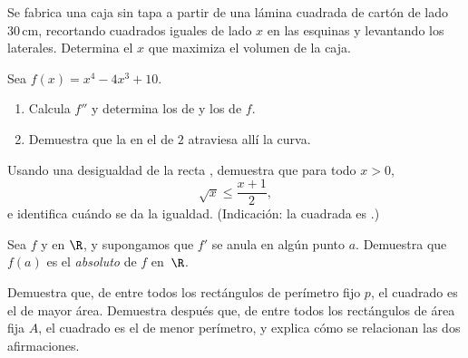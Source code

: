 \begin{exercise}[$\star\star$]\label{exo:g12:deriv:5}
Se fabrica una caja sin tapa a partir de una lámina cuadrada de cartón de
lado $30\,$cm, recortando cuadrados iguales de lado $x$ en las esquinas y
levantando los laterales. Determina el $x$ que maximiza el volumen de la
caja.
\end{exercise}

\begin{exercise}[$\star\star$]\label{exo:g12:deriv:6}
Sea $f(x) = x^4 - 4x^3 + 10$.
\begin{enumerate}
  \item Calcula $f''$ y determina los  de  y los  de $f$.
  \item Demuestra que la  en el  de  $2$
        atraviesa allí la curva.
\end{enumerate}
\end{exercise}

\begin{exercise}[$\star\star$]\label{exo:g12:deriv:7}
Usando una desigualdad de la recta , demuestra que para todo
$x > 0$,
\[
\sqrt{x} \leq \frac{x + 1}{2},
\]
e identifica cuándo se da la igualdad. (Indicación: la  cuadrada es
.)
\end{exercise}

\begin{exercise}[$\star\star\star$]\label{exo:g12:deriv:8}
Sea $f$  y  en $\R$, y supongamos que $f'$ se anula en
algún punto $a$. Demuestra que $f(a)$ es el  \emph{absoluto} de $f$
en~$\R$.
\end{exercise}

\begin{exercise}[$\star\star\star$]\label{exo:g12:deriv:9}
Demuestra que, de entre todos los rectángulos de perímetro fijo $p$, el
cuadrado es el de mayor área. Demuestra después que, de entre todos los
rectángulos de área fija $A$, el cuadrado es el de menor perímetro, y
explica cómo se relacionan las dos afirmaciones.
\end{exercise}

